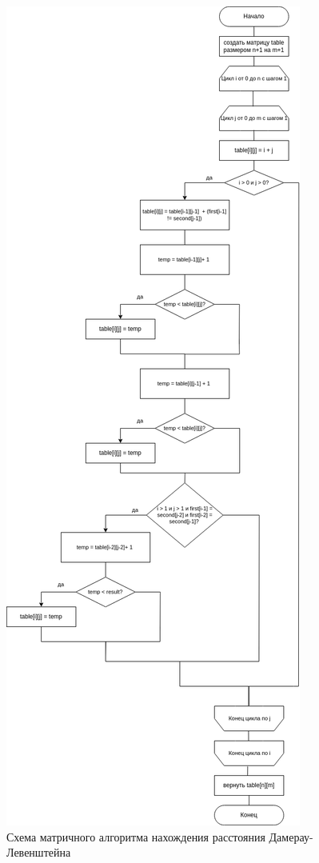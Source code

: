 \clearpage

\begin{figure}[h!]
	\centering
	\includegraphics[height=0.8\textheight]{tex_parts/scheme4.png}
	\caption{\label{fig:damItr}Схема матричного алгоритма нахождения расстояния Дамерау-Левенштейна}
\end{figure}

